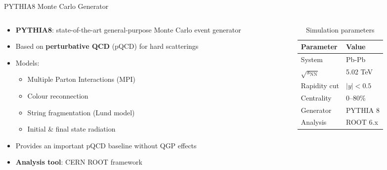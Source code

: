 \documentclass[10pt, aspectratio=169]{beamer}
\begin{document}
\begin{frame}{PYTHIA8 Monte Carlo Generator}

  \begin{columns}
    \begin{column}{0.55\textwidth}
      \begin{itemize}
        \item \textbf{PYTHIA8}: state-of-the-art general-purpose Monte Carlo event generator
        \item Based on \textbf{perturbative QCD} (pQCD) for hard scatterings
        \item Models:
          \begin{itemize}
            \item Multiple Parton Interactions (MPI)
            \item Colour reconnection
            \item String fragmentation (Lund model)
            \item Initial \& final state radiation
          \end{itemize}
        \item Provides an important \alert{pQCD baseline} without QGP effects
        \item \textbf{Analysis tool}: CERN ROOT framework
      \end{itemize}
    \end{column}
    \begin{column}{0.42\textwidth}
      \begin{table}
        \renewcommand{\arraystretch}{1.4}
        \begin{tabular}{ll}
          \toprule
          \textbf{Parameter} & \textbf{Value} \\
          \midrule
          System       & Pb-Pb \\
          $\sqrt{s_\mathrm{NN}}$ & 5.02 TeV \\
          Rapidity cut & $|y| < 0.5$ \\
          Centrality   & 0--80\% \\
          Generator    & PYTHIA 8 \\
          Analysis     & ROOT 6.x \\
          \bottomrule
        \end{tabular}
        \caption{Simulation parameters}
      \end{table}
    \end{column}
  \end{columns}

\end{frame}
\end{document}
